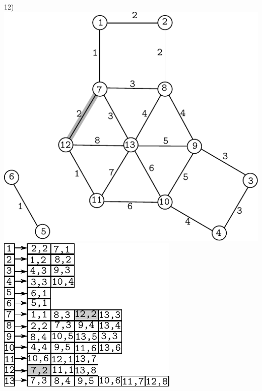 \documentclass{article}
\begin{document}
\begin{center}
12)\includegraphics[scale=0.6]{bottleneck/g12}
\hspace{5mm}
\includegraphics[scale=0.9]{bottleneck/l12}
\end{center}
\end{document}
